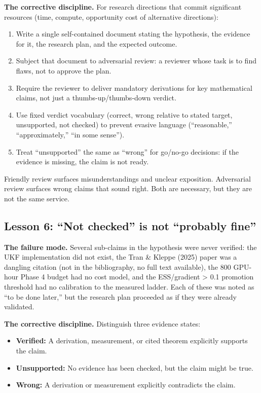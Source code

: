 \textbf{The corrective discipline.} For research directions that commit significant resources (time, compute, opportunity cost of alternative directions):
\begin{enumerate}
\item Write a single self-contained document stating the hypothesis, the evidence for it, the research plan, and the expected outcome.
\item Subject that document to adversarial review: a reviewer whose task is to find flaws, not to approve the plan.
\item Require the reviewer to deliver mandatory derivations for key mathematical claims, not just a thumbs-up/thumbs-down verdict.
\item Use fixed verdict vocabulary (correct, wrong relative to stated target, unsupported, not checked) to prevent evasive language (``reasonable,'' ``approximately,'' ``in some sense'').
\item Treat ``unsupported'' the same as ``wrong'' for go/no-go decisions: if the evidence is missing, the claim is not ready.
\end{enumerate}

Friendly review surfaces misunderstandings and unclear exposition. Adversarial review surfaces wrong claims that sound right. Both are necessary, but they are not the same service.

\subsection{Lesson 6: ``Not checked'' is not ``probably fine''}

\textbf{The failure mode.} Several sub-claims in the hypothesis were never verified: the UKF implementation did not exist, the Tran \& Kleppe (2025) paper was a dangling citation (not in the bibliography, no full text available), the 800 GPU-hour Phase 4 budget had no cost model, and the ESS/gradient > 0.1 promotion threshold had no calibration to the measured ladder. Each of these was noted as ``to be done later,'' but the research plan proceeded as if they were already validated.

\textbf{The corrective discipline.} Distinguish three evidence states:
\begin{itemize}
\item \textbf{Verified:} A derivation, measurement, or cited theorem explicitly supports the claim.
\item \textbf{Unsupported:} No evidence has been checked, but the claim might be true.
\item \textbf{Wrong:} A derivation or measurement explicitly contradicts the claim.
\end{itemize}

